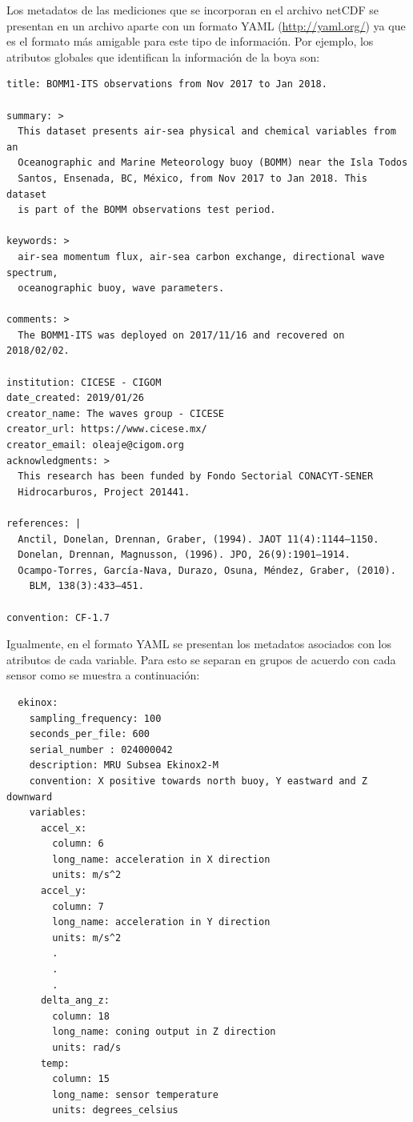 \documentclass[11pt]{article}
\begin{document}
Los metadatos de las mediciones que se incorporan en el archivo netCDF se
presentan en un archivo aparte con un formato YAML (\url{http://yaml.org/}) ya
que es el formato más amigable para este tipo de información. Por ejemplo, los
atributos globales que identifican la información de la boya son:

\begin{verbatim}
title: BOMM1-ITS observations from Nov 2017 to Jan 2018.

summary: >
  This dataset presents air-sea physical and chemical variables from an
  Oceanographic and Marine Meteorology buoy (BOMM) near the Isla Todos
  Santos, Ensenada, BC, México, from Nov 2017 to Jan 2018. This dataset
  is part of the BOMM observations test period.

keywords: >
  air-sea momentum flux, air-sea carbon exchange, directional wave spectrum,
  oceanographic buoy, wave parameters.

comments: >
  The BOMM1-ITS was deployed on 2017/11/16 and recovered on 2018/02/02.

institution: CICESE - CIGOM
date_created: 2019/01/26
creator_name: The waves group - CICESE
creator_url: https://www.cicese.mx/
creator_email: oleaje@cigom.org
acknowledgments: >
  This research has been funded by Fondo Sectorial CONACYT-SENER
  Hidrocarburos, Project 201441.

references: |
  Anctil, Donelan, Drennan, Graber, (1994). JAOT 11(4):1144–1150.
  Donelan, Drennan, Magnusson, (1996). JPO, 26(9):1901–1914.
  Ocampo-Torres, García-Nava, Durazo, Osuna, Méndez, Graber, (2010).
    BLM, 138(3):433–451.

convention: CF-1.7
\end{verbatim}

Igualmente, en el formato YAML se presentan los metadatos asociados con los
atributos de cada variable. Para esto se separan en grupos de acuerdo con cada
sensor como se muestra a continuación:

\begin{verbatim}
  ekinox:
    sampling_frequency: 100
    seconds_per_file: 600
    serial_number : 024000042
    description: MRU Subsea Ekinox2-M
    convention: X positive towards north buoy, Y eastward and Z downward
    variables:
      accel_x:
        column: 6
        long_name: acceleration in X direction
        units: m/s^2
      accel_y:
        column: 7
        long_name: acceleration in Y direction
        units: m/s^2
        .
        .
        .
      delta_ang_z:
        column: 18
        long_name: coning output in Z direction
        units: rad/s
      temp:
        column: 15
        long_name: sensor temperature
        units: degrees_celsius
\end{verbatim}
\end{document}
